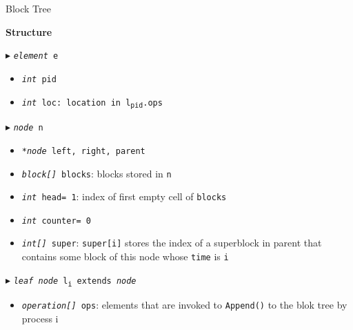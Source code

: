 \documentclass[10pt]{article}
\theoremstyle{definition}
\begin{document}

 


\begin{algorithm}
\caption{Block Tree \label{alg2}}
\begin{algorithmic}[1]
\begin{multicols}{2}

\Statex \textbf{Structure}

\Statex $\blacktriangleright$ \texttt{\textsl{element} e}
\begin{itemize}
\item \texttt{\textsl{int} pid}
\item \texttt{\textsl{int} loc\textsf{: location in \texttt{l\textsubscript{pid}}.ops}}
\end{itemize}


\Statex $\blacktriangleright$ \texttt{\textsl{node} n}
\begin{itemize}
\item \texttt{\textsl{*node} left, right, parent}
\item \texttt{\textsl{block[]} blocks}\textsf{: blocks stored in \texttt{n}}
\item \texttt{\textsl{int} head= 1}\textsf{: index of first empty cell of \texttt{blocks}}
\item \texttt{\textsl{int} counter= 0}\textsf{}
\item \texttt{\textsl{int[]} super}\textsf{: \texttt{super[i]} stores the index of a superblock in parent that contains some block of this node whose \texttt{time} is \texttt{i}}
\end{itemize}

\Statex $\blacktriangleright$ \texttt{\textsl{leaf node} l\textsubscript{i} extends \textsl{node}}
\begin{itemize}
\item \texttt{\textsl{operation[]} ops}\textsf{: elements that are invoked to \texttt{Append()} to the blok tree by process i}
\end{itemize}



\end{multicols}
\end{algorithmic}
\end{algorithm}
\end{document}
